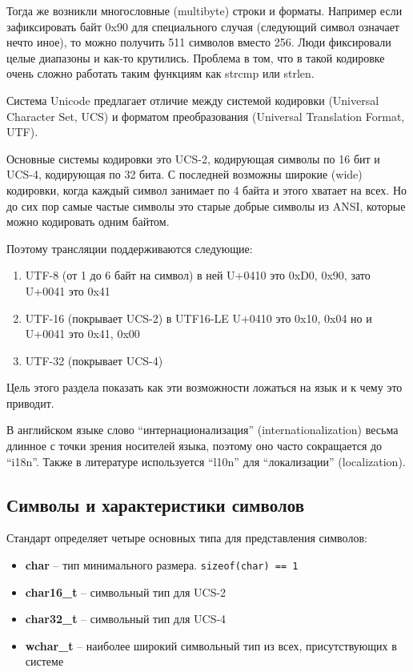 \documentclass[a4paper,12pt,oneside]{book}
\begin{document}
Тогда же возникли многословные (multibyte) строки и форматы. Например если зафиксировать байт 0x90 для специального случая (следующий символ означает нечто иное), то можно получить 511 символов вместо 256. Люди фиксировали целые диапазоны и как-то крутились. Проблема в том, что в такой кодировке очень сложно работать таким функциям как strcmp или strlen.

Система Unicode предлагает отличие между системой кодировки (Universal Character Set, UCS) и форматом преобразования (Universal Translation Format, UTF). 

Основные системы кодировки это UCS-2, кодирующая символы по 16 бит и UCS-4, кодирующая по 32 бита. С последней возможны широкие (wide) кодировки, когда каждый символ занимает по 4 байта и этого хватает на всех. Но до сих пор самые частые символы это старые добрые символы из ANSI, которые можно кодировать одним байтом.

Поэтому трансляции поддерживаются следующие:

\begin{enumerate}
\item UTF-8 (от 1 до 6 байт на символ) в ней U+0410 это {0xD0, 0x90}, зато U+0041 это {0x41}
\item UTF-16 (покрывает UCS-2) в UTF16-LE U+0410 это {0x10, 0x04} но и U+0041 это {0x41, 0x00}
\item UTF-32 (покрывает UCS-4)
\end{enumerate}

Цель этого раздела показать как эти возможности ложаться на язык и к чему это приводит.

В английском языке слово ``интернационализация'' (internationalization) весьма длинное с точки зрения носителей языка, поэтому оно часто сокращается до ``i18n''. Также в литературе используется ``l10n'' для ``локализации'' (localization).

\subsection{Символы и характеристики символов}

Стандарт определяет четыре основных типа для представления символов:

\begin{itemize}
\item \textbf{char} -- тип минимального размера. \lstinline!sizeof(char) == 1!
\item \textbf{char16\_t} -- символьный тип для UCS-2
\item \textbf{char32\_t} -- символьный тип для UCS-4
\item \textbf{wchar\_t} -- наиболее широкий символьный тип из всех, присутствующих в системе
\end{itemize}
\end{document}
